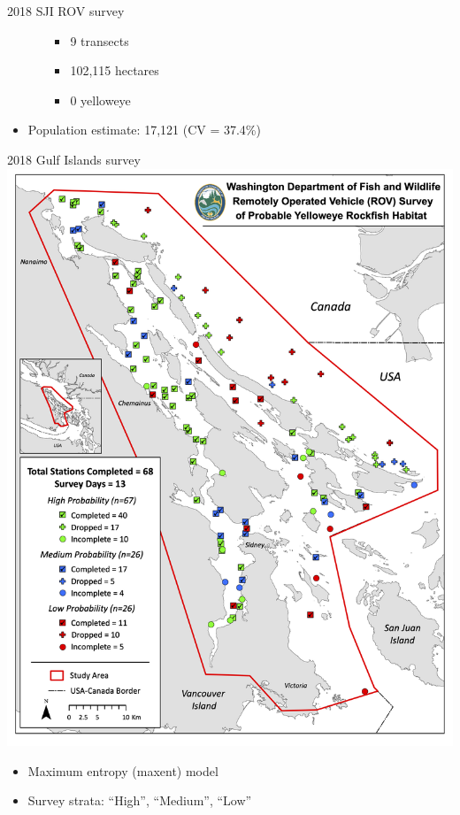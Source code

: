 \documentclass[
  ignorenonframetext,
]{beamer}
\providecommand{\tightlist}{%
  \setlength{\itemsep}{0pt}\setlength{\parskip}{0pt}}
\begin{document}
\begin{frame}{2018 SJI ROV survey}
\begin{itemize}
\begin{itemize}
    \begin{itemize}
    \tightlist
    \item
      9 transects
    \item
      102,115 hectares
    \item
      0 yelloweye
    \end{itemize}
  \end{itemize}
\item
  Population estimate: 17,121 (CV = 37.4\%)
\end{itemize}
\end{frame}

\begin{frame}{2018 Gulf Islands survey}
\protect\hypertarget{gulf-islands-survey}{}
\includegraphics[width=1\textwidth,height=\textheight]{2018_GI_map.png}

\begin{itemize}
\tightlist
\item
  Maximum entropy (maxent) model
\item
  Survey strata: ``High'', ``Medium'', ``Low''


\end{itemize}
\end{frame}
\end{document}
